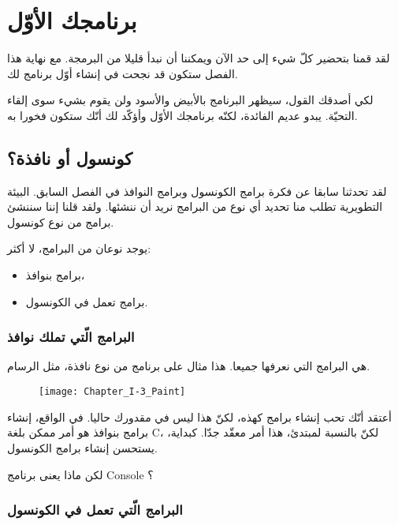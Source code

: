 \chapter{برنامجك الأوّل}

لقد قمنا بتحضير كلّ شيء إلى حد الآن ويمكننا أن نبدأ قليلا من البرمجة. مع نهاية هذا الفصل ستكون قد نجحت في إنشاء أوّل برنامج لك.

لكي أصدقك القول، سيظهر البرنامج بالأبيض والأسود ولن يقوم بشيء سوى إلقاء التحيّة. يبدو عديم الفائدة، لكنّه برنامجك الأوّل وأؤكّد لك أنّك ستكون فخورا به.

\section{كونسول أو نافذة؟}

لقد تحدثنا سابقا عن فكرة برامج الكونسول وبرامج النوافذ في الفصل السابق. البيئة التطويرية تطلب منا تحديد أي نوع من البرامج نريد أن ننشئها. ولقد قلنا إننا سننشئ برامج من نوع كونسول.

يوجد نوعان من البرامج، لا أكثر:

\begin{itemize}
  \item برامج بنوافذ،
  \item برامج تعمل في الكونسول.
\end{itemize}

\subsection{البرامج الّتي تملك نوافذ}

هي البرامج التي نعرفها جميعا. هذا مثال على برنامج من نوع نافذة، مثل الرسام.

\begin{figure}[H]
	\centering
	\texttt{[image: Chapter\_I-3\_Paint]}
\end{figure}

أعتقد أنّك تحب إنشاء برامج كهذه، لكنّ هذا ليس في مقدورك حاليا. في الواقع، إنشاء برامج بنوافذ هو أمر ممكن بلغة \textenglish{C}، لكنّ بالنسبة لمبتدئ، هذا أمر معقّد جدّا. كبداية، يستحسن إنشاء برامج الكونسول.

\begin{question}
  لكن ماذا يعنى برنامج
\textenglish{Console}
؟
\end{question}

\subsection{البرامج الّتي تعمل في الكونسول}


